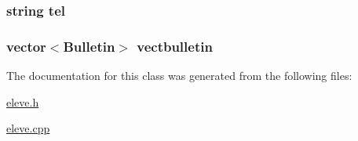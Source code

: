 \hypertarget{classEleve_a83fe46bb36be495f70937ef3181f71e0}{
\subsubsection[{tel}]{\setlength{\rightskip}{0pt plus 5cm}string tel\hspace{0.3cm}{\ttfamily [private]}}}\label{classEleve_a83fe46bb36be495f70937ef3181f71e0}
\hypertarget{classEleve_ae77c6b6b9a488e85b2a45f86ae0686ab}{
\subsubsection[{vectbulletin}]{\setlength{\rightskip}{0pt plus 5cm}vector$<${\bf Bulletin}$>$ vectbulletin\hspace{0.3cm}{\ttfamily [private]}}}\label{classEleve_ae77c6b6b9a488e85b2a45f86ae0686ab}


The documentation for this class was generated from the following files\+:\begin{DoxyCompactItemize}
\item 
\hyperlink{eleve_8h}{eleve.\+h}\item 
\hyperlink{eleve_8cpp}{eleve.\+cpp}\end{DoxyCompactItemize}
